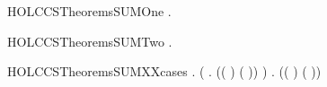 \newcommand{\HOLCCSTheoremsRESTRXXNILXXNOXXTRANS}{\UseVerbatim{HOLCCSTheoremsRESTRXXNILXXNOXXTRANS}}
\begin{SaveVerbatim}{HOLCCSTheoremsSUMOne}
\HOLTokenTurnstile{} \HOLSymConst{\HOLTokenForall{}}   .  \HOLTokenTransBegin{}\HOLTokenTransEnd {} \HOLSymConst{\HOLTokenImp{}}  \HOLSymConst{\ensuremath{+}}  \HOLTokenTransBegin{}\HOLTokenTransEnd {}
\end{SaveVerbatim}
\newcommand{\HOLCCSTheoremsSUMOne}{\UseVerbatim{HOLCCSTheoremsSUMOne}}
\begin{SaveVerbatim}{HOLCCSTheoremsSUMTwo}
\HOLTokenTurnstile{} \HOLSymConst{\HOLTokenForall{}}   .  \HOLTokenTransBegin{}\HOLTokenTransEnd {} \HOLSymConst{\HOLTokenImp{}}  \HOLSymConst{\ensuremath{+}}  \HOLTokenTransBegin{}\HOLTokenTransEnd {}
\end{SaveVerbatim}
\newcommand{\HOLCCSTheoremsSUMTwo}{\UseVerbatim{HOLCCSTheoremsSUMTwo}}
\begin{SaveVerbatim}{HOLCCSTheoremsSUMXXcases}
\HOLTokenTurnstile{} \HOLSymConst{\HOLTokenForall{}}   .
        \HOLSymConst{\ensuremath{+}}  \HOLTokenTransBegin{}\HOLTokenTransEnd {} \HOLSymConst{\HOLTokenImp{}}
       (\HOLSymConst{\HOLTokenExists{}} . (( \HOLSymConst{=} ) \HOLSymConst{\HOLTokenConj{}} ( \HOLSymConst{=} )) \HOLSymConst{\HOLTokenConj{}}  \HOLTokenTransBegin{}\HOLTokenTransEnd {}) \HOLSymConst{\HOLTokenDisj{}}
       \HOLSymConst{\HOLTokenExists{}} . (( \HOLSymConst{=} ) \HOLSymConst{\HOLTokenConj{}} ( \HOLSymConst{=} )) \HOLSymConst{\HOLTokenConj{}}  \HOLTokenTransBegin{}\HOLTokenTransEnd {}
\end{SaveVerbatim}
